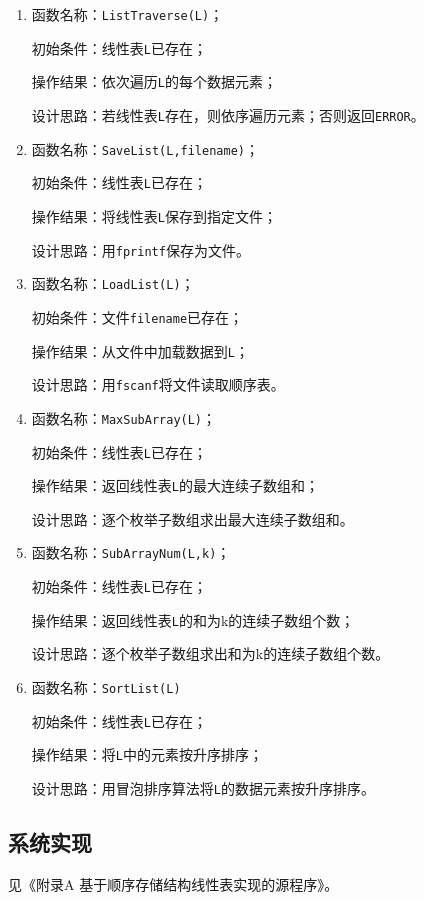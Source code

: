 \documentclass[supercite]{Experimental_Report}
\theoremstyle{definition}
\begin{document}
\begin{enumerate}
\item 函数名称：\verb|ListTraverse(L)|；

初始条件：线性表\verb|L|已存在；

操作结果：依次遍历\verb|L|的每个数据元素；

设计思路：若线性表\verb|L|存在，则依序遍历元素；否则返回\verb|ERROR|。

\item 函数名称：\verb|SaveList(L,filename)|；

初始条件：线性表\verb|L|已存在；

操作结果：将线性表\verb|L|保存到指定文件；

设计思路：用\verb|fprintf|保存为文件。

\item 函数名称：\verb|LoadList(L)|；

初始条件：文件\verb|filename|已存在；

操作结果：从文件中加载数据到\verb|L|；

设计思路：用\verb|fscanf|将文件读取顺序表。

\item 函数名称：\verb|MaxSubArray(L)|；

初始条件：线性表\verb|L|已存在；

操作结果：返回线性表\verb|L|的最大连续子数组和；

设计思路：逐个枚举子数组求出最大连续子数组和。

\item 函数名称：\verb|SubArrayNum(L,k)|；

初始条件：线性表\verb|L|已存在；

操作结果：返回线性表\verb|L|的和为k的连续子数组个数；

设计思路：逐个枚举子数组求出和为k的连续子数组个数。

\item 函数名称：\verb|SortList(L)|

初始条件：线性表\verb|L|已存在；

操作结果：将\verb|L|中的元素按升序排序；

设计思路：用冒泡排序算法将\verb|L|的数据元素按升序排序。

\end{enumerate}

\subsection{系统实现}

见《附录A 基于顺序存储结构线性表实现的源程序》。
\end{document}
